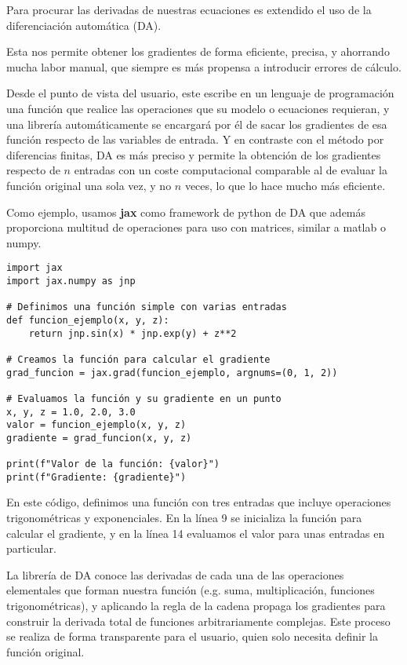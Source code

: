 Para procurar las derivadas de nuestras ecuaciones es extendido el uso de la
diferenciación automática (DA).

Esta nos permite obtener los gradientes de forma eficiente, precisa, y
ahorrando mucha labor manual, que siempre es más propensa a introducir errores
de cálculo.

Desde el punto de vista del usuario, este escribe en un lenguaje de
programación una función que realice las operaciones que su modelo o ecuaciones
requieran, y una librería automáticamente se encargará por él de sacar los
gradientes de esa función respecto de las variables de entrada. Y en contraste
con el método por diferencias finitas, DA es más preciso y permite la obtención
de los gradientes respecto de $n$ entradas con un coste computacional
comparable al de evaluar la función original una sola vez, y no $n$ veces, lo
que lo hace mucho más eficiente.

Como ejemplo, usamos \textbf{jax} \cite{jax2018github} como framework de python
de DA que además proporciona multitud de operaciones para uso con matrices,
similar a matlab o numpy.

\begin{verbatim}
import jax
import jax.numpy as jnp

# Definimos una función simple con varias entradas
def funcion_ejemplo(x, y, z):
    return jnp.sin(x) * jnp.exp(y) + z**2

# Creamos la función para calcular el gradiente
grad_funcion = jax.grad(funcion_ejemplo, argnums=(0, 1, 2))

# Evaluamos la función y su gradiente en un punto
x, y, z = 1.0, 2.0, 3.0
valor = funcion_ejemplo(x, y, z)
gradiente = grad_funcion(x, y, z)

print(f"Valor de la función: {valor}")
print(f"Gradiente: {gradiente}")
\end{verbatim}

En este código, definimos una función con tres entradas que incluye operaciones
trigonométricas y exponenciales. En la línea 9 se inicializa la función para
calcular el gradiente, y en la línea 14 evaluamos el valor para unas entradas
en particular.

La librería de DA conoce las derivadas de cada una de las operaciones
elementales que forman nuestra función (e.g. suma, multiplicación, funciones
trigonométricas), y aplicando la regla de la cadena propaga los gradientes para
construir la derivada total de funciones arbitrariamente complejas. Este
proceso se realiza de forma transparente para el usuario, quien solo necesita
definir la función original.

